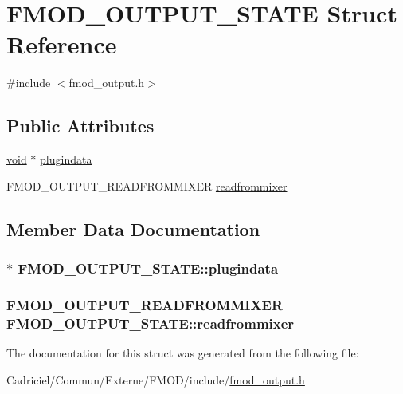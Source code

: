 \hypertarget{struct_f_m_o_d___o_u_t_p_u_t___s_t_a_t_e}{\section{F\-M\-O\-D\-\_\-\-O\-U\-T\-P\-U\-T\-\_\-\-S\-T\-A\-T\-E Struct Reference}
\label{struct_f_m_o_d___o_u_t_p_u_t___s_t_a_t_e}
}


{\ttfamily \#include $<$fmod\-\_\-output.\-h$>$}

\subsection*{Public Attributes}
\begin{DoxyCompactItemize}
\item 
\hyperlink{wglew_8h_aeea6e3dfae3acf232096f57d2d57f084}{void} $\ast$ \hyperlink{struct_f_m_o_d___o_u_t_p_u_t___s_t_a_t_e_a08d52689c8b698c0ea363c7403e8978b}{plugindata}
\item 
F\-M\-O\-D\-\_\-\-O\-U\-T\-P\-U\-T\-\_\-\-R\-E\-A\-D\-F\-R\-O\-M\-M\-I\-X\-E\-R \hyperlink{struct_f_m_o_d___o_u_t_p_u_t___s_t_a_t_e_a297cdb7fbba2150340cceecf8d4c9ca1}{readfrommixer}
\end{DoxyCompactItemize}


\subsection{Member Data Documentation}
\hypertarget{struct_f_m_o_d___o_u_t_p_u_t___s_t_a_t_e_a08d52689c8b698c0ea363c7403e8978b}{
\subsubsection[{plugindata}]{$\ast$ F\-M\-O\-D\-\_\-\-O\-U\-T\-P\-U\-T\-\_\-\-S\-T\-A\-T\-E\-::plugindata}}\label{struct_f_m_o_d___o_u_t_p_u_t___s_t_a_t_e_a08d52689c8b698c0ea363c7403e8978b}
\hypertarget{struct_f_m_o_d___o_u_t_p_u_t___s_t_a_t_e_a297cdb7fbba2150340cceecf8d4c9ca1}{
\subsubsection[{readfrommixer}]{\setlength{\rightskip}{0pt plus 5cm}F\-M\-O\-D\-\_\-\-O\-U\-T\-P\-U\-T\-\_\-\-R\-E\-A\-D\-F\-R\-O\-M\-M\-I\-X\-E\-R F\-M\-O\-D\-\_\-\-O\-U\-T\-P\-U\-T\-\_\-\-S\-T\-A\-T\-E\-::readfrommixer}}\label{struct_f_m_o_d___o_u_t_p_u_t___s_t_a_t_e_a297cdb7fbba2150340cceecf8d4c9ca1}


The documentation for this struct was generated from the following file\-:\begin{DoxyCompactItemize}
\item 
Cadriciel/\-Commun/\-Externe/\-F\-M\-O\-D/include/\hyperlink{fmod__output_8h}{fmod\-\_\-output.\-h}\end{DoxyCompactItemize}
